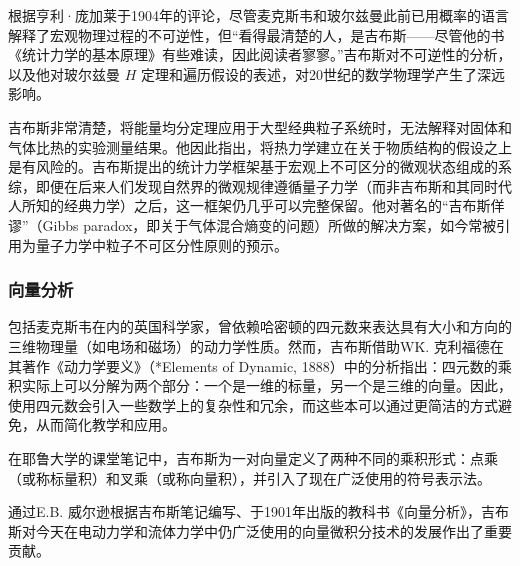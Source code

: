 根据亨利·庞加莱于1904年的评论，尽管麦克斯韦和玻尔兹曼此前已用概率的语言解释了宏观物理过程的不可逆性，但“看得最清楚的人，是吉布斯——尽管他的书《统计力学的基本原理》有些难读，因此阅读者寥寥。”吉布斯对不可逆性的分析，以及他对玻尔兹曼 $H$ 定理和遍历假设的表述，对20世纪的数学物理学产生了深远影响。

吉布斯非常清楚，将能量均分定理应用于大型经典粒子系统时，无法解释对固体和气体比热的实验测量结果。他因此指出，将热力学建立在关于物质结构的假设之上是有风险的。吉布斯提出的统计力学框架基于宏观上不可区分的微观状态组成的系综，即便在后来人们发现自然界的微观规律遵循量子力学（而非吉布斯和其同时代人所知的经典力学）之后，这一框架仍几乎可以完整保留。他对著名的“吉布斯佯谬”（Gibbs paradox，即关于气体混合熵变的问题）所做的解决方案，如今常被引用为量子力学中粒子不可区分性原则的预示。
\subsubsection{向量分析}
包括麦克斯韦在内的英国科学家，曾依赖哈密顿的四元数来表达具有大小和方向的三维物理量（如电场和磁场）的动力学性质。然而，吉布斯借助W\.K. 克利福德在其著作《动力学要义》（*Elements of Dynamic, 1888）中的分析指出：四元数的乘积实际上可以分解为两个部分：一个是一维的标量，另一个是三维的向量。因此，使用四元数会引入一些数学上的复杂性和冗余，而这些本可以通过更简洁的方式避免，从而简化教学和应用。

在耶鲁大学的课堂笔记中，吉布斯为一对向量定义了两种不同的乘积形式：点乘（或称标量积）和叉乘（或称向量积），并引入了现在广泛使用的符号表示法。

通过E.B. 威尔逊根据吉布斯笔记编写、于1901年出版的教科书《向量分析》，吉布斯对今天在电动力学和流体力学中仍广泛使用的向量微积分技术的发展作出了重要贡献。
